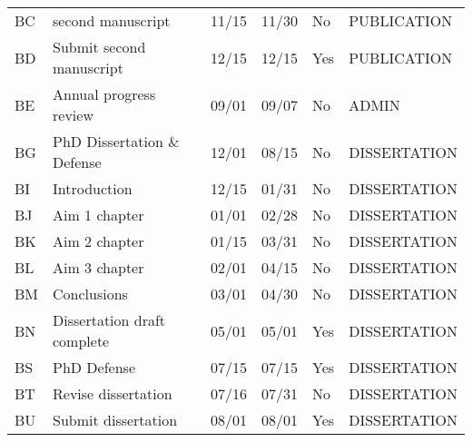 \documentclass[portrait,a4paper]{article}
\begin{document}
\begin{longtable}{p{2cm}p{4cm}p{2cm}p{2cm}p{2cm}p{3cm}}
BC & second manuscript & 11/15 & 11/30 & No & PUBLICATION \\
BD & Submit second manuscript & 12/15 & 12/15 & Yes & PUBLICATION \\
BE & Annual progress review & 09/01 & 09/07 & No & ADMIN \\
BG & PhD Dissertation \& Defense & 12/01 & 08/15 & No & DISSERTATION \\
BI & Introduction & 12/15 & 01/31 & No & DISSERTATION \\
BJ & Aim 1 chapter & 01/01 & 02/28 & No & DISSERTATION \\
BK & Aim 2 chapter & 01/15 & 03/31 & No & DISSERTATION \\
BL & Aim 3 chapter & 02/01 & 04/15 & No & DISSERTATION \\
BM & Conclusions & 03/01 & 04/30 & No & DISSERTATION \\
BN & Dissertation draft complete & 05/01 & 05/01 & Yes & DISSERTATION \\
BS & PhD Defense & 07/15 & 07/15 & Yes & DISSERTATION \\
BT & Revise dissertation & 07/16 & 07/31 & No & DISSERTATION \\
BU & Submit dissertation & 08/01 & 08/01 & Yes & DISSERTATION \\

\bottomrule
\end{longtable}
\end{document}
